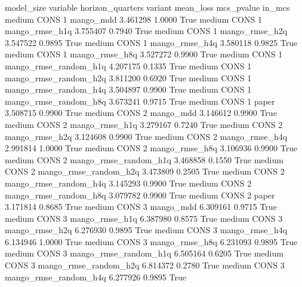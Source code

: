 model_size variable  horizon_quarters               variant  mean_loss  mcs_pvalue  in_mcs
    medium     CONS                 1             mango_mdd   3.461298      1.0000    True
    medium     CONS                 1        mango_rmse_h1q   3.755407      0.7940    True
    medium     CONS                 1        mango_rmse_h2q   3.547522      0.9895    True
    medium     CONS                 1        mango_rmse_h4q   3.580118      0.9825    True
    medium     CONS                 1        mango_rmse_h8q   3.527272      0.9900    True
    medium     CONS                 1 mango_rmse_random_h1q   4.207175      0.1335    True
    medium     CONS                 1 mango_rmse_random_h2q   3.811200      0.6920    True
    medium     CONS                 1 mango_rmse_random_h4q   3.504897      0.9900    True
    medium     CONS                 1 mango_rmse_random_h8q   3.673241      0.9715    True
    medium     CONS                 1                 paper   3.508715      0.9900    True
    medium     CONS                 2             mango_mdd   3.146612      0.9900    True
    medium     CONS                 2        mango_rmse_h1q   3.279167      0.7240    True
    medium     CONS                 2        mango_rmse_h2q   3.124608      0.9900    True
    medium     CONS                 2        mango_rmse_h4q   2.991814      1.0000    True
    medium     CONS                 2        mango_rmse_h8q   3.106936      0.9900    True
    medium     CONS                 2 mango_rmse_random_h1q   3.468858      0.1550    True
    medium     CONS                 2 mango_rmse_random_h2q   3.473809      0.2505    True
    medium     CONS                 2 mango_rmse_random_h4q   3.145293      0.9900    True
    medium     CONS                 2 mango_rmse_random_h8q   3.079782      0.9900    True
    medium     CONS                 2                 paper   3.171814      0.8685    True
    medium     CONS                 3             mango_mdd   6.309161      0.9715    True
    medium     CONS                 3        mango_rmse_h1q   6.387980      0.8575    True
    medium     CONS                 3        mango_rmse_h2q   6.276930      0.9895    True
    medium     CONS                 3        mango_rmse_h4q   6.134946      1.0000    True
    medium     CONS                 3        mango_rmse_h8q   6.231093      0.9895    True
    medium     CONS                 3 mango_rmse_random_h1q   6.505164      0.6205    True
    medium     CONS                 3 mango_rmse_random_h2q   6.814372      0.2780    True
    medium     CONS                 3 mango_rmse_random_h4q   6.277926      0.9895    True
